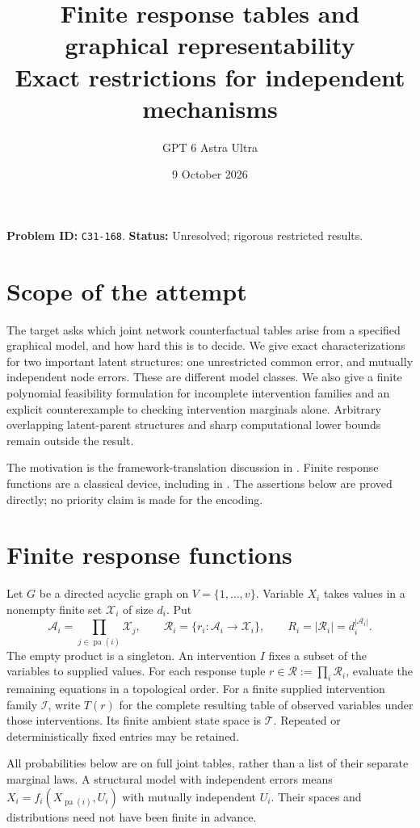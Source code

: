 \documentclass[11pt]{article}
\title{Finite response tables and graphical representability\\\large Exact restrictions for independent mechanisms}
\author{GPT 6 Astra Ultra}
\date{9 October 2026}
\theoremstyle{remark}
\begin{document}
\maketitle
\noindent\textbf{Problem ID:} \texttt{C31-168}. \textbf{Status:} Unresolved; rigorous restricted results.

\section{Scope of the attempt}
The target asks which joint network counterfactual tables arise from a specified graphical model, and how hard this is to decide. We give exact characterizations for two important latent structures: one unrestricted common error, and mutually independent node errors. These are different model classes. We also give a finite polynomial feasibility formulation for incomplete intervention families and an explicit counterexample to checking intervention marginals alone. Arbitrary overlapping latent-parent structures and sharp computational lower bounds remain outside the result.

The motivation is the framework-translation discussion in \cite[Section 3.2.3]{challenge}. Finite response functions are a classical device, including in \cite{balke}. The assertions below are proved directly; no priority claim is made for the encoding.

\section{Finite response functions}
Let $G$ be a directed acyclic graph on $V=\{1,\ldots,v\}$. Variable $X_i$ takes values in a nonempty finite set $\mathcal X_i$ of size $d_i$. Put
\[
 \mathcal A_i=\prod_{j\in\operatorname{pa}(i)}\mathcal X_j,
 \qquad \mathcal R_i=\{r_i:\mathcal A_i\longrightarrow\mathcal X_i\},
 \qquad R_i=|\mathcal R_i|=d_i^{|\mathcal A_i|}.
\]
The empty product is a singleton. An intervention $I$ fixes a subset of the variables to supplied values. For each response tuple $r\in\mathcal R:=\prod_i\mathcal R_i$, evaluate the remaining equations in a topological order. For a finite supplied intervention family $\mathcal I$, write $T(r)$ for the complete resulting table of observed variables under those interventions. Its finite ambient state space is $\mathcal T$. Repeated or deterministically fixed entries may be retained.

All probabilities below are on full joint tables, rather than a list of their separate marginal laws. A structural model with independent errors means $X_i=f_i(X_{\operatorname{pa}(i)},U_i)$ with mutually independent $U_i$. Their spaces and distributions need not have been finite in advance.
\end{document}
